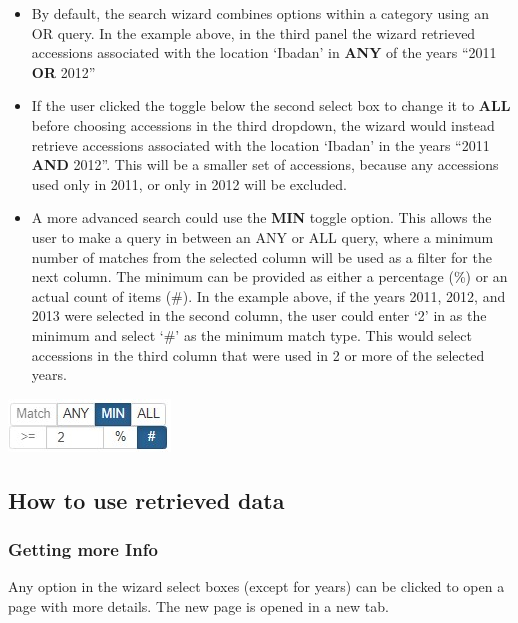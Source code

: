 \documentclass[
  12pt,
]{book}
\begin{document}
\begin{itemize}
\item
  By default, the search wizard combines options within a category using an OR query. In the example above, in the third panel the wizard retrieved accessions associated with the location `Ibadan' in \textbf{ANY} of the years ``2011 \textbf{OR} 2012''
\item
  If the user clicked the toggle below the second select box to change it to \textbf{ALL} before choosing accessions in the third dropdown, the wizard would instead retrieve accessions associated with the location `Ibadan' in the years ``2011 \textbf{AND} 2012''. This will be a smaller set of accessions, because any accessions used only in 2011, or only in 2012 will be excluded.
\item
  A more advanced search could use the \textbf{MIN} toggle option. This allows the user to make a query in between an ANY or ALL query, where a minimum number of matches from the selected column will be used as a filter for the next column. The minimum can be provided as either a percentage (\%) or an actual count of items (\#). In the example above, if the years 2011, 2012, and 2013 were selected in the second column, the user could enter `2' in as the minimum and select `\#' as the minimum match type. This would select accessions in the third column that were used in 2 or more of the selected years.
\end{itemize}

\begin{center}\includegraphics[width=0.25\linewidth]{assets/images/wizard_any_min_all_toggle_min_details} \end{center}

\hypertarget{how-to-use-retrieved-data}{%
\subsection{How to use retrieved data}\label{how-to-use-retrieved-data}}

\hypertarget{getting-more-info}{%
\subsubsection*{Getting more Info}\label{getting-more-info}}


Any option in the wizard select boxes (except for years) can be clicked to open a page with more details. The new page is opened in a new tab.
\end{document}
